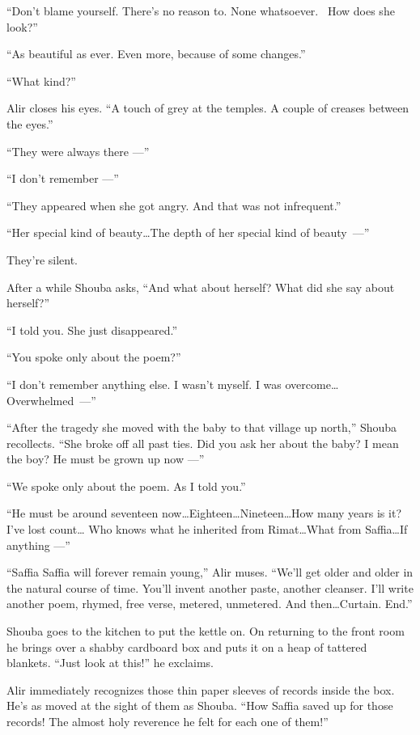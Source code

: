 \documentclass[twoside,11pt,openany]{book}
\begin{document}
``Don't blame yourself. There's no reason to. None whatsoever.~ How does she look?''

``As beautiful as ever. Even more, because of some changes.''

``What kind?''

Alir closes his eyes. ``A touch of grey at the temples. A couple of creases between the
eyes.''

``They were always there ---''

``I don't remember ---''

``They appeared when she got angry. And that was not infrequent.''

``Her special kind of beauty{\ldots}The depth of her special kind of beauty~---''

They're silent.

After a while Shouba asks, ``And what about herself? What did she say about herself?''

``I told you. She just disappeared.''

``You spoke only about the poem?''

``I don't remember anything else. I wasn't myself. I was
overcome{\ldots}\linebreak[0]\hbox{Overwhelmed~---''}

``After the tragedy she moved with the baby to that village up north,'' Shouba recollects.
``She broke off all past ties. Did you ask her about the baby? I mean the boy? He must be grown up now ---''

``We spoke only about the poem. As I told you.''

``He must be around seventeen now{\ldots}Eighteen{\ldots}Nineteen{\ldots}How many years is it? I've lost
count{\ldots} Who knows what he inherited from Rimat{\ldots}What from Saffia{\ldots}If anything ---''

``Saffia Saffia will forever remain young,'' Alir muses. ``We'll get older and
older in the natural course of time. You'll invent another paste, another cleanser. I'll write another poem, rhymed,
free verse, metered, unmetered. And then{\ldots}Curtain. End.''

Shouba goes to the kitchen to put the kettle on. On returning to the front room he brings over a shabby cardboard box
and puts it on a heap of tattered blankets. ``Just look at this!'' he exclaims.

Alir immediately recognizes those thin paper sleeves of records inside the box. He's as moved at the sight of them as
Shouba. ``How Saffia saved up for those records! The almost holy reverence he felt for each one of
them!''
\end{document}
